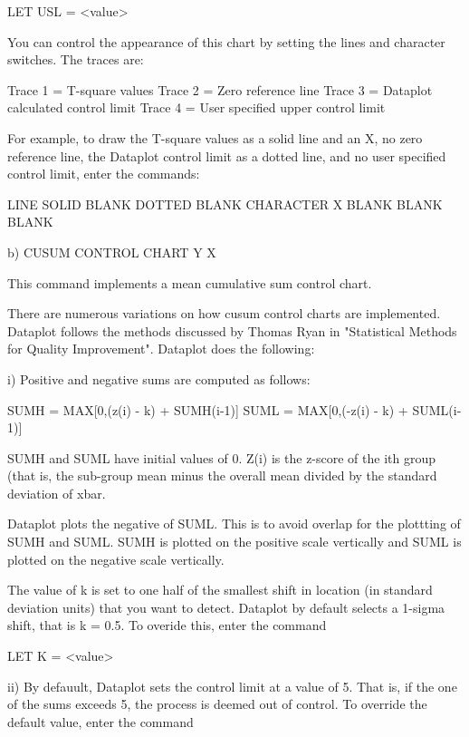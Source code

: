 {           LET USL = <value>

       You can control the appearance of this chart by setting
       the lines and character switches.  The traces are:

          Trace 1 = T-square values
          Trace 2 = Zero reference line
          Trace 3 = Dataplot calculated control limit
          Trace 4 = User specified upper control limit

       For example, to draw the T-square values as a solid line
       and an X, no zero reference line, the Dataplot control
       limit as a dotted line, and no user specified control
       limit, enter the commands:

           LINE SOLID BLANK DOTTED BLANK
           CHARACTER X BLANK BLANK BLANK

    b) CUSUM CONTROL CHART Y X

       This command implements a mean cumulative sum control
       chart.

       There are numerous variations on how cusum control
       charts are implemented.  Dataplot follows the methods
       discussed by Thomas Ryan in "Statistical Methods for
       Quality Improvement".  Dataplot does the following:

         i) Positive and negative sums are computed as follows:

               SUMH = MAX[0,(z(i) - k) + SUMH(i-1)] 
               SUML = MAX[0,(-z(i) - k) + SUML(i-1)] 

            SUMH and SUML have initial values of 0.  Z(i) is
            the z-score of the ith group (that is, the sub-group
            mean minus the overall mean divided by the
            standard deviation of xbar. 

            Dataplot plots the negative of SUML.  This is to
            avoid overlap for the plottting of SUMH and SUML.
            SUMH is plotted on the positive scale vertically and
            SUML is plotted on the negative scale vertically.

            The value of k is set to one half of the smallest
            shift in location (in standard deviation units)
            that you want to detect.  Dataplot by default selects
            a 1-sigma shift, that is k = 0.5.  To overide this,
            enter the command

                 LET K = <value>

       ii)  By defauult, Dataplot sets the control limit at
            a value of 5.  That is, if the one of the sums exceeds
            5, the process is deemed out of control.  To override
            the default value, enter the command

}

